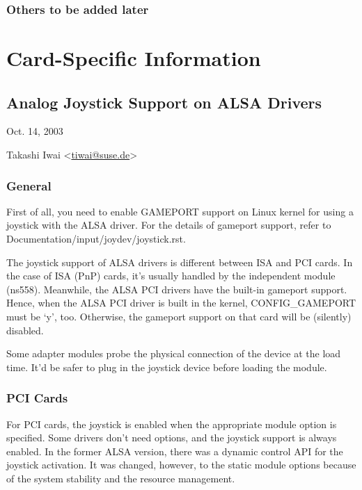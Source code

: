 \documentclass[a4paper,8pt,english]{sphinxmanual}
\begin{document}
\subsection{Others to be added later}
\label{sound/hd-audio/dp-mst:others-to-be-added-later}

\chapter{Card-Specific Information}
\label{sound/cards/index:card-specific-information}\label{sound/cards/index::doc}

\section{Analog Joystick Support on ALSA Drivers}
\label{sound/cards/joystick:analog-joystick-support-on-alsa-drivers}\label{sound/cards/joystick::doc}
Oct. 14, 2003

Takashi Iwai \textless{}\href{mailto:tiwai@suse.de}{tiwai@suse.de}\textgreater{}


\subsection{General}
\label{sound/cards/joystick:general}
First of all, you need to enable GAMEPORT support on Linux kernel for
using a joystick with the ALSA driver.  For the details of gameport
support, refer to Documentation/input/joydev/joystick.rst.

The joystick support of ALSA drivers is different between ISA and PCI
cards.  In the case of ISA (PnP) cards, it's usually handled by the
independent module (ns558).  Meanwhile, the ALSA PCI drivers have the
built-in gameport support.  Hence, when the ALSA PCI driver is built
in the kernel, CONFIG\_GAMEPORT must be `y', too.  Otherwise, the
gameport support on that card will be (silently) disabled.

Some adapter modules probe the physical connection of the device at
the load time.  It'd be safer to plug in the joystick device before
loading the module.


\subsection{PCI Cards}
\label{sound/cards/joystick:pci-cards}
For PCI cards, the joystick is enabled when the appropriate module
option is specified.  Some drivers don't need options, and the
joystick support is always enabled.  In the former ALSA version, there
was a dynamic control API for the joystick activation.  It was
changed, however, to the static module options because of the system
stability and the resource management.
\end{document}
